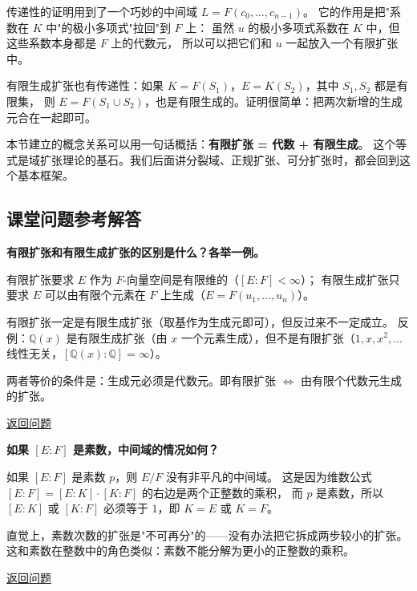传递性的证明用到了一个巧妙的中间域 $L = F(c_0, \ldots, c_{n-1})$。
它的作用是把"系数在 $K$ 中"的极小多项式"拉回"到 $F$ 上：
虽然 $u$ 的极小多项式系数在 $K$ 中，但这些系数本身都是 $F$ 上的代数元，
所以可以把它们和 $u$ 一起放入一个有限扩张中。

有限生成扩张也有传递性：如果 $K = F(S_1)$，$E = K(S_2)$，其中 $S_1, S_2$ 都是有限集，
则 $E = F(S_1 \cup S_2)$，也是有限生成的。证明很简单：把两次新增的生成元合在一起即可。

本节建立的概念关系可以用一句话概括：\textbf{有限扩张 = 代数 + 有限生成}。
这个等式是域扩张理论的基石。我们后面讲分裂域、正规扩张、可分扩张时，都会回到这个基本框架。

\subsection*{课堂问题参考解答}

\begin{exercise}\label{ex:ans-finite-vs-finitely-generated}
\hypertarget{ans:finite-vs-finitely-generated}{}
\textbf{有限扩张和有限生成扩张的区别是什么？各举一例。}

有限扩张要求 $E$ 作为 $F$-向量空间是有限维的（$[E:F] < \infty$）；
有限生成扩张只要求 $E$ 可以由有限个元素在 $F$ 上生成（$E = F(u_1, \ldots, u_n)$）。

有限扩张一定是有限生成扩张（取基作为生成元即可），但反过来不一定成立。
反例：$\mathbb{Q}(x)$ 是有限生成扩张（由 $x$ 一个元素生成），但不是有限扩张（$1, x, x^2, \ldots$ 线性无关，$[\mathbb{Q}(x):\mathbb{Q}] = \infty$）。

两者等价的条件是：生成元必须是代数元。即有限扩张 $\Leftrightarrow$ 由有限个代数元生成的扩张。

\hyperlink{q:finite-vs-finitely-generated}{返回问题}
\end{exercise}

\begin{exercise}\label{ex:ans-prime-intermediate}
\hypertarget{ans:prime-intermediate}{}
\textbf{如果 $[E:F]$ 是素数，中间域的情况如何？}

如果 $[E:F]$ 是素数 $p$，则 $E/F$ 没有非平凡的中间域。
这是因为维数公式 $[E:F] = [E:K] \cdot [K:F]$ 的右边是两个正整数的乘积，
而 $p$ 是素数，所以 $[E:K]$ 或 $[K:F]$ 必须等于 $1$，即 $K = E$ 或 $K = F$。

直觉上，素数次数的扩张是"不可再分"的——没有办法把它拆成两步较小的扩张。
这和素数在整数中的角色类似：素数不能分解为更小的正整数的乘积。

\hyperlink{q:prime-intermediate}{返回问题}
\end{exercise}

